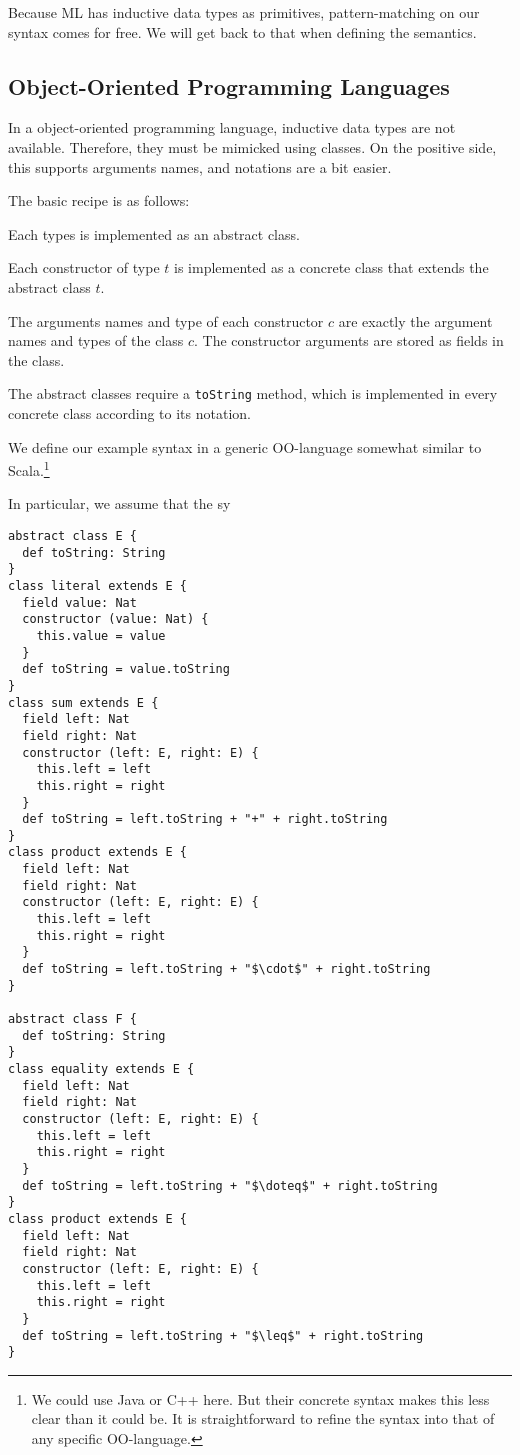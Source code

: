 Because ML has inductive data types as primitives, pattern-matching on our syntax comes for free.
We will get back to that when defining the semantics.

\subsection{Object-Oriented Programming Languages}

In a object-oriented programming language, inductive data types are not available.
Therefore, they must be mimicked using classes.
On the positive side, this supports arguments names, and notations are a bit easier.

The basic recipe is as follows:
\begin{compactitem}
\item Each types is implemented as an abstract class.
\item Each constructor of type $t$ is implemented as a concrete class that extends the abstract class $t$.
\item The arguments names and type of each constructor $c$ are exactly the argument names and types of the class $c$.
The constructor arguments are stored as fields in the class.
\item The abstract classes require a \texttt{toString} method, which is implemented in every concrete class according to its notation.
\end{compactitem}


\begin{example}
We define our example syntax in a generic OO-language somewhat similar to Scala.\footnote{We could use Java or C++ here. But their concrete syntax makes this less clear than it could be. It is straightforward to refine the syntax into that of any specific OO-language.}

In particular, we assume that the sy

\begin{lstlisting}
abstract class E {
  def toString: String
}
class literal extends E {
  field value: Nat
  constructor (value: Nat) {
    this.value = value
  }
  def toString = value.toString
}
class sum extends E {
  field left: Nat
  field right: Nat
  constructor (left: E, right: E) {
    this.left = left
    this.right = right
  }
  def toString = left.toString + "+" + right.toString
}
class product extends E {
  field left: Nat
  field right: Nat
  constructor (left: E, right: E) {
    this.left = left
    this.right = right
  }
  def toString = left.toString + "$\cdot$" + right.toString
}

abstract class F {
  def toString: String
}
class equality extends E {
  field left: Nat
  field right: Nat
  constructor (left: E, right: E) {
    this.left = left
    this.right = right
  }
  def toString = left.toString + "$\doteq$" + right.toString
}
class product extends E {
  field left: Nat
  field right: Nat
  constructor (left: E, right: E) {
    this.left = left
    this.right = right
  }
  def toString = left.toString + "$\leq$" + right.toString
}
\end{lstlisting}
\end{example}


